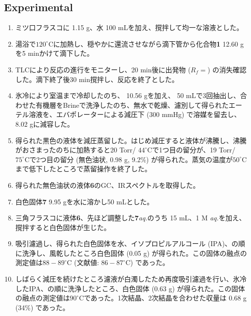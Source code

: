 \documentclass{ltjsarticle}
\theoremstyle{definition}
\numberwithin{equation}{section}
\newcommand{\D}{^\circ\text{C}}
\begin{document}
\subsection{Experimental}
\begin{enumerate}
\item ミツ口フラスコに 1.15 g、水 100 mLを加え、撹拌して均一な溶液とした。
\item 湯浴で$120\D$に加熱し、穏やかに還流させながら滴下管から化合物\textbf{1} 12.60 gを5 minかけて滴下した。 
\item TLCにより反応の進行をモニターし、20 min後に出発物 ($R_f = %
$) の消失確認した。滴下終了後30 min撹拌し、反応を終了とした。
\item 氷冷により室温まで冷却したのち、 10.56 gを加え、 50 mLで3回抽出し、合わせた有機層をBrineで洗浄したのち、無水で乾燥、濾別して得られたエーテル溶液を、エバポレーターによる減圧下 (300 mmHg) で溶媒を留去し、8.02 gに減容した。
\item 得られた黒色の液体を減圧蒸留した。はじめ減圧すると液体が沸騰し、沸騰がおさまったのちに加熱すると20 Torr/ $44\D$で1つ目の留分が、19 Torr/ $75\D$で2つ目の留分 (無色油状, 0.98 g, 9.2\%) が得られた。蒸気の温度が$50\D$まで低下したところで蒸留操作を終了した。
\item 得られた無色油状の液体\textbf{6}のGC、IRスペクトルを取得した。
\item 白色固体\textbf{7} 9.95 gを水に溶かし50 mLとした。
\item 三角フラスコに液体\textbf{6}、先ほど調整した\textbf{7}\textit{aq.}のうち 15 mL、1 M \textit{aq.}を加え、撹拌すると白色固体が生じた。
\item 吸引濾過し、得られた白色固体を水、イソプロピルアルコール (IPA)、の順に洗浄し、風乾したところ白色固体 (0.05 g) が得られた。この固体の融点の測定値は$88-89\D$ (文献値: $86-87\D$) であった。
\item しばらく減圧を続けたところ濾液が白濁したため再度吸引濾過を行い、氷冷したIPA、の順に洗浄したところ、白色固体 (0.63 g) が得られた。この固体の融点の測定値は$90\D$であった。1次結晶、2次結晶を合わせた収量は 0.68 g (34\%) であった。
\end{enumerate}
\end{document}
